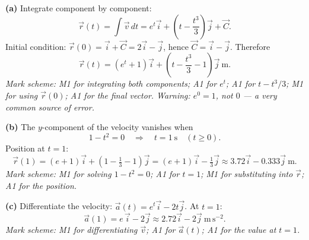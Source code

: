 \documentclass[11pt]{article}
\begin{document}
\begin{corrige}
\textbf{(a)} Integrate component by component:
\[ \vec{r}(t) = \int \vec{v}\,dt = e^{t}\vec{i} + \left(t - \frac{t^3}{3}\right)\vec{j} + \vec{C}. \]
Initial condition: $\vec{r}(0) = \vec{i} + \vec{C} = 2\vec{i} - \vec{j}$, hence $\vec{C} = \vec{i} - \vec{j}$. Therefore
\[ \vec{r}(t) = (e^{t} + 1)\vec{i} + \left(t - \frac{t^3}{3} - 1\right)\vec{j}\ \mathrm{m}. \]
\emph{Mark scheme: M1 for integrating both components; A1 for $e^t$; A1 for $t - t^3/3$; M1 for using $\vec{r}(0)$; A1 for the final vector. Warning: $e^0 = 1$, not $0$ — a very common source of error.}

\textbf{(b)} The $y$-component of the velocity vanishes when
\[ 1 - t^2 = 0 \quad\Longrightarrow\quad t = 1\ \mathrm{s} \quad (t \geq 0). \]
Position at $t = 1$:
\[ \vec{r}(1) = (e + 1)\vec{i} + \left(1 - \tfrac{1}{3} - 1\right)\vec{j} = (e + 1)\vec{i} - \tfrac{1}{3}\vec{j} \approx 3.72\vec{i} - 0.333\vec{j}\ \mathrm{m}. \]
\emph{Mark scheme: M1 for solving $1 - t^2 = 0$; A1 for $t = 1$; M1 for substituting into $\vec{r}$; A1 for the position.}

\textbf{(c)} Differentiate the velocity: $\vec{a}(t) = e^{t}\vec{i} - 2t\vec{j}$. At $t = 1$:
\[ \vec{a}(1) = e\,\vec{i} - 2\vec{j} \approx 2.72\vec{i} - 2\vec{j}\ \mathrm{m\,s^{-2}}. \]
\emph{Mark scheme: M1 for differentiating $\vec{v}$; A1 for $\vec{a}(t)$; A1 for the value at $t = 1$.}
\end{corrige}
\end{document}
